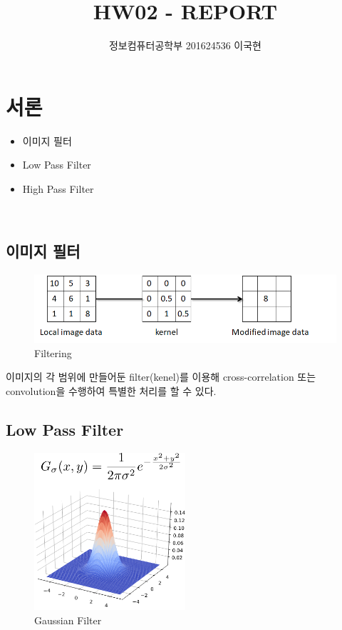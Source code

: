 \documentclass[]{report}
\title{HW02 - REPORT}
\author{정보컴퓨터공학부 201624536 이국현}
\begin{document}
\maketitle

\chapter{서론}
\begin{itemize}
	\item 이미지 필터
	\item Low Pass Filter
	\item High Pass Filter
\end{itemize}
\
\section{이미지 필터}

\begin{figure}[ht!]
	\centering
	\includegraphics[width=1\textwidth]{image/filtering.png}
	\caption{Filtering}
	\label{filtering}
\end{figure}

이미지의 각 범위에 만들어둔 filter(kenel)를 이용해 cross-correlation 또는 convolution을 수행하여 특별한 처리를 할 수 있다. \\

\section{Low Pass Filter}

\begin{figure}[ht!]
	\centering
	\includegraphics[width=0.5\textwidth]{image/gaussianFilter.png}
	\caption{Gaussian Filter}
	\label{gaussianFilter}
\end{figure} 
\end{document}
